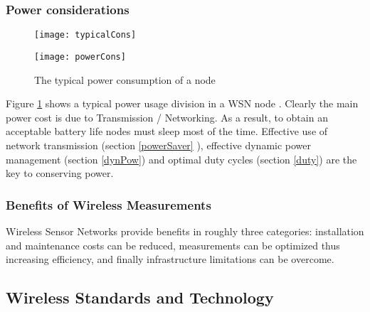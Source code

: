 \subsubsection{Power considerations}
\begin{figure}[t]%
\centering
\texttt{[image: typicalCons]}
\end{figure} 
\begin{figure}[t]%
\centering
\texttt{[image: powerCons]}
\caption{The typical power consumption of a node}
\label{fig:typicalCons2}
\end{figure}
\noindent Figure \ref{fig:typicalCons2} shows a typical power usage division in a WSN node \citep{NIWSN}. Clearly the main power cost is due to Transmission / Networking. As a result, to obtain an acceptable battery life nodes must sleep most of the time. Effective use of network transmission (section \ref{powerSaver} ), effective dynamic power management (section \ref{dynPow}) and optimal duty cycles (section \ref{duty}) are the key to conserving power.\\
\subsubsection{Benefits of Wireless Measurements}
Wireless Sensor Networks provide benefits in roughly three categories: installation and maintenance costs can be reduced, measurements can be optimized thus increasing efficiency, and finally infrastructure limitations can be overcome.
\subsection{Wireless Standards and Technology}
